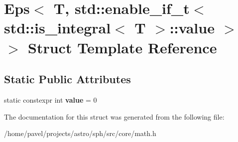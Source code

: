 \hypertarget{structEps_3_01T_00_01std_1_1enable__if__t_3_01std_1_1is__integral_3_01T_01_4_1_1value_01_4_01_4}{}\section{Eps$<$ T, std\+:\+:enable\+\_\+if\+\_\+t$<$ std\+:\+:is\+\_\+integral$<$ T $>$\+:\+:value $>$ $>$ Struct Template Reference}
\label{structEps_3_01T_00_01std_1_1enable__if__t_3_01std_1_1is__integral_3_01T_01_4_1_1value_01_4_01_4}
\subsection*{Static Public Attributes}
\begin{DoxyCompactItemize}
\item 
\hypertarget{structEps_3_01T_00_01std_1_1enable__if__t_3_01std_1_1is__integral_3_01T_01_4_1_1value_01_4_01_4_a45e8823c1a4740a8c6d739aa2c098d43}{}\label{structEps_3_01T_00_01std_1_1enable__if__t_3_01std_1_1is__integral_3_01T_01_4_1_1value_01_4_01_4_a45e8823c1a4740a8c6d739aa2c098d43} 
static constexpr int {\bfseries value} = 0
\end{DoxyCompactItemize}


The documentation for this struct was generated from the following file\+:\begin{DoxyCompactItemize}
\item 
/home/pavel/projects/astro/sph/src/core/math.\+h\end{DoxyCompactItemize}
